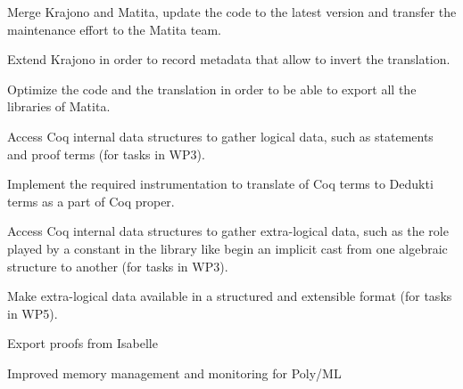 \begin{workpackage}
\begin{tasklist}
\begin{task}[id=matita,
  title=Integrate the Matita translator in Matita itself,
  shorttitle=Matita,
  lead=Bol,
  BolRM=4,
  wphases=1-12]
\vspace{-5mm}
\begin{compactitem}
\item Merge Krajono and Matita, update the code to the latest
  version and transfer the maintenance effort to the Matita team.
\item Extend Krajono in order to record metadata that allow to
  invert the translation.
\item Optimize the code and the translation in order to be able to
  export all the libraries of Matita.
\end{compactitem}
\end{task}

\begin{task}[id=coq,
  title=Instrument Coq,
  shorttitle=Coq,
  lead=Bol,
  BolRM=12,
  InrRM=6,
  wphases=1-8]
\vspace{-5mm}
\begin{compactitem}
\item Access Coq internal data structures to gather logical data, such as
statements and proof terms (for tasks in WP3).
\item Implement the required instrumentation to translate of Coq terms
to Dedukti terms as a part of Coq proper.
\item Access Coq internal data structures to gather extra-logical data,
such as the role played by a constant in the library like begin an implicit
cast from one algebraic structure to another (for tasks in WP3).
\item Make extra-logical data available in a structured and
  extensible format (for tasks in WP5).
\end{compactitem}
\end{task}
\end{tasklist}

\begin{wpdelivs}

  \begin{wpdeliv}[due=12,miles=isabelle,id=isabelle,dissem=PU,nature=OTHER,lead=Tum,task=isabelle]{Export proofs from Isabelle}\end{wpdeliv}

  \begin{wpdeliv}[due=12,id=isabelleImproved,dissem=PU,nature=OTHER,lead=Tum,task=isabelle]{Improved memory management and monitoring for Poly/ML}\end{wpdeliv}


\end{wpdelivs}
\end{workpackage}
